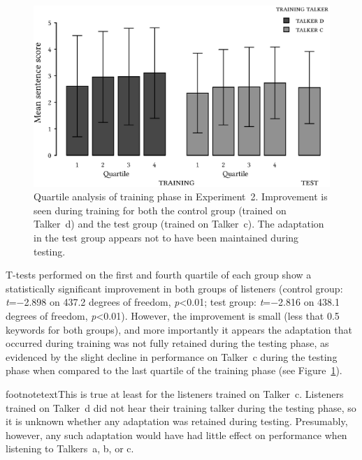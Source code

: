 \begin{figure}[htbp]
	\begin{centering}
	\includegraphics{figures/results/QuartileBarplot.eps}
	\caption[Quartile analysis of training phase in Experiment~2]{Quartile analysis of training phase in Experiment~2.  Improvement is seen during training for both the control group (trained on Talker~\ac{d}) and the test group (trained on Talker~\ac{c}).  The adaptation in the test group appears not to have been maintained during testing.\label{fig:Quartile}}
	\end{centering}
\end{figure}

T-tests performed on the first and fourth quartile of each group show a statistically significant improvement in both groups of listeners (control group: \textit{t}=−2.898 on 437.2 degrees of freedom, \textit{p}<0.01; test group: \textit{t}=−2.816 on 438.1 degrees of freedom, \textit{p}<0.01).  However, the improvement is small (less that 0.5 keywords for both groups), and more importantly it appears the adaptation that occurred during training was not fully retained during the testing phase, as evidenced by the slight decline in performance on Talker~\ac{c} during the testing phase when compared to the last quartile of the training phase (see Figure~\ref{fig:Quartile}).\footnotemark{}

footnotetext{This is true at least for the listeners trained on Talker~\ac{c}.  Listeners trained on Talker~\ac{d} did not hear their training talker during the testing phase, so it is unknown whether any adaptation was retained during testing.  Presumably, however, any such adaptation would have had little effect on performance when listening to Talkers~\ac{a}, \ac{b}, or \ac{c}.}

